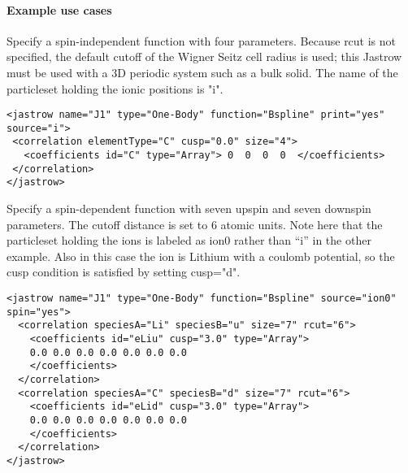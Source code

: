 \paragraph{Example use cases}
\label{sec:1bjsplineexamples}

Specify a spin-independent function with four parameters. Because rcut  is not 
specified, the default cutoff of the Wigner Seitz cell radius is used; this 
Jastrow must be used with a 3D periodic system such as a bulk solid. The name of 
the particleset holding the ionic positions is "i".
\begin{lstlisting}[style=XML]
<jastrow name="J1" type="One-Body" function="Bspline" print="yes" source="i">
 <correlation elementType="C" cusp="0.0" size="4">
   <coefficients id="C" type="Array"> 0  0  0  0  </coefficients>
 </correlation>
</jastrow>
\end{lstlisting}

Specify a spin-dependent function with seven upspin and seven downspin parameters. 
The cutoff distance is set to 6 atomic units.  Note here that the particleset holding
the ions is labeled as ion0 rather than ``i'' in the other example.  Also in this case
the ion is Lithium with a coulomb potential, so the cusp condition is satisfied by 
setting cusp="d".
\begin{lstlisting}[style=XML]
<jastrow name="J1" type="One-Body" function="Bspline" source="ion0" spin="yes">
  <correlation speciesA="Li" speciesB="u" size="7" rcut="6">
    <coefficients id="eLiu" cusp="3.0" type="Array"> 
    0.0 0.0 0.0 0.0 0.0 0.0 0.0
    </coefficients>
  </correlation>
  <correlation speciesA="C" speciesB="d" size="7" rcut="6">
    <coefficients id="eLid" cusp="3.0" type="Array"> 
    0.0 0.0 0.0 0.0 0.0 0.0 0.0
    </coefficients>
  </correlation>
</jastrow>
\end{lstlisting}

